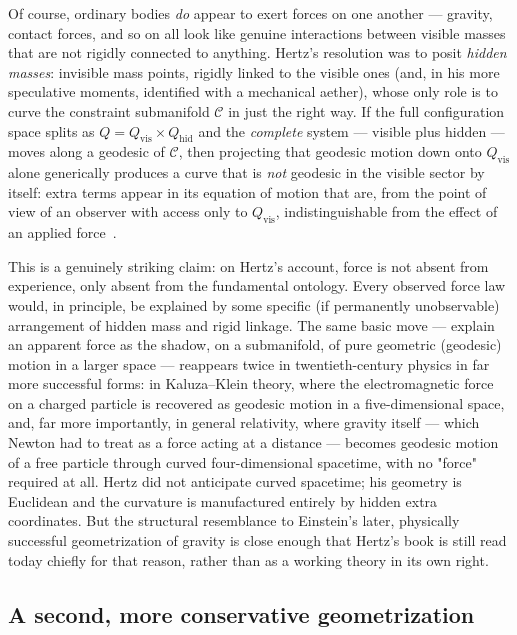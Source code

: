 Of course, ordinary bodies \emph{do} appear to exert forces on one
another --- gravity, contact forces, and so on all look like genuine
interactions between visible masses that are not rigidly connected
to anything. Hertz's resolution was to posit \emph{hidden masses}:
invisible mass points, rigidly linked to the visible ones (and, in
his more speculative moments, identified with a mechanical
aether), whose only role is to curve the constraint submanifold
$\mathcal C$ in just the right way. If the full configuration space
splits as $Q = Q_{\mathrm{vis}}\times Q_{\mathrm{hid}}$ and the
\emph{complete} system --- visible plus hidden --- moves along a
geodesic of $\mathcal C$, then projecting that geodesic motion down
onto $Q_{\mathrm{vis}}$ alone generically produces a curve that is
\emph{not} geodesic in the visible sector by itself: extra terms
appear in its equation of motion that are, from the point of view of
an observer with access only to $Q_{\mathrm{vis}}$, indistinguishable
from the effect of an applied force~\cite{Hertz1899}.

This is a genuinely striking claim: on Hertz's account, force is not
absent from experience, only absent from the fundamental ontology.
Every observed force law would, in principle, be explained by some
specific (if permanently unobservable) arrangement of hidden mass
and rigid linkage. The same basic move --- explain an apparent force
as the shadow, on a submanifold, of pure geometric (geodesic) motion
in a larger space --- reappears twice in twentieth-century physics
in far more successful forms: in Kaluza--Klein theory, where the
electromagnetic force on a charged particle is recovered as geodesic
motion in a five-dimensional space, and, far more importantly, in
general relativity, where gravity itself --- which Newton had to
treat as a force acting at a distance --- becomes geodesic motion of
a free particle through curved four-dimensional spacetime, with no
"force" required at all. Hertz did not anticipate curved spacetime;
his geometry is Euclidean and the curvature is manufactured entirely
by hidden extra coordinates. But the structural resemblance to
Einstein's later, physically successful geometrization of gravity is
close enough that Hertz's book is still read today chiefly for that
reason, rather than as a working theory in its own
right.

\subsection{A second, more conservative geometrization}

